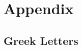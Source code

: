 \documentclass[
thesis.tex
]{subfiles}
\begin{document}

\section{Appendix}


\subsection{Greek Letters}

\vspace*{0.5cm}
\end{document}
